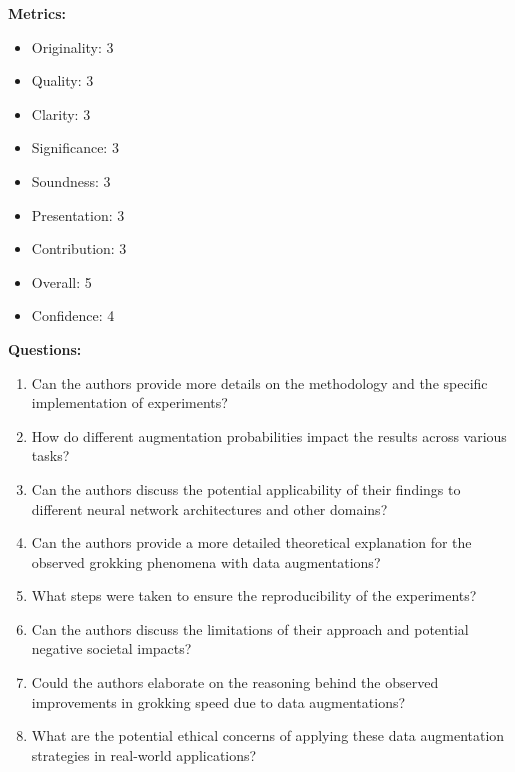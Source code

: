 \begin{tcolorbox}[colback=blue!5!white, colframe=blue!75!black,]
\textbf{Metrics:}
\begin{itemize}
    \item Originality: 3
    \item Quality: 3
    \item Clarity: 3
    \item Significance: 3
    \item Soundness: 3
    \item Presentation: 3
    \item Contribution: 3
    \item Overall: 5
    \item Confidence: 4
\end{itemize}

\textbf{Questions:}
\begin{enumerate}
    \item Can the authors provide more details on the methodology and the specific implementation of experiments?
    \item How do different augmentation probabilities impact the results across various tasks?
    \item Can the authors discuss the potential applicability of their findings to different neural network architectures and other domains?
    \item Can the authors provide a more detailed theoretical explanation for the observed grokking phenomena with data augmentations?
    \item What steps were taken to ensure the reproducibility of the experiments?
    \item Can the authors discuss the limitations of their approach and potential negative societal impacts?
    \item Could the authors elaborate on the reasoning behind the observed improvements in grokking speed due to data augmentations?
    \item What are the potential ethical concerns of applying these data augmentation strategies in real-world applications?
\end{enumerate}
\end{tcolorbox}

